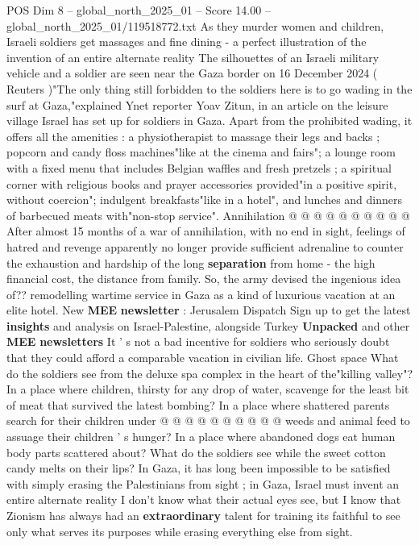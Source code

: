 \begin{textsample}{POS Dim 8 – global\_north\_2025\_01 – Score 14.00 – global\_north\_2025\_01/119518772.txt}  \label{ex:f8_pos_103}
As they murder women and children, Israeli soldiers get massages and fine dining - a perfect illustration of the invention of an entire alternate reality The silhouettes of an Israeli military vehicle and a soldier are seen near the Gaza border on 16 December 2024 ( Reuters )"The only thing still forbidden to the soldiers here is to go wading in the surf at Gaza,"explained Ynet reporter Yoav Zitun, in an article on the leisure village Israel has set up for soldiers in Gaza.
Apart from the prohibited wading, it offers all the amenities : a physiotherapist to massage their legs and backs ; popcorn and candy floss machines"like at the cinema and fairs"; a lounge room with a fixed menu that includes Belgian waffles and fresh pretzels ; a spiritual corner with religious books and prayer accessories provided"in a positive spirit, without coercion"; indulgent breakfasts"like in a hotel", and lunches and dinners of barbecued meats with"non-stop service".
Annihilation @ @ @ @ @ @ @ @ @ @ After almost 15 months of a war of annihilation, with no end in sight, feelings of hatred and revenge apparently no longer provide sufficient adrenaline to counter the exhaustion and hardship of the long \textbf{separation} from home - the high financial cost, the distance from family.
So, the army devised the ingenious idea of?? remodelling wartime service in Gaza as a kind of luxurious vacation at an elite hotel.
New \textbf{MEE} \textbf{newsletter} : Jerusalem Dispatch Sign up to get the latest \textbf{insights} and analysis on Israel-Palestine, alongside Turkey \textbf{Unpacked} and other \textbf{MEE} \textbf{newsletters} It ' s not a bad incentive for soldiers who seriously doubt that they could afford a comparable vacation in civilian life.
Ghost space What do the soldiers see from the deluxe spa complex in the heart of the"killing valley"?
In a place where children, thirsty for any drop of water, scavenge for the least bit of meat that survived the latest bombing?
In a place where shattered parents search for their children under @ @ @ @ @ @ @ @ @ @ weeds and animal feed to assuage their children ' s hunger?
In a place where abandoned dogs eat human body parts scattered about?
What do the soldiers see while the sweet cotton candy melts on their lips?
In Gaza, it has long been impossible to be satisfied with simply erasing the Palestinians from sight ; in Gaza, Israel must invent an entire alternate reality I don't know what their actual eyes see, but I know that Zionism has always had an \textbf{extraordinary} talent for training its faithful to see only what serves its purposes while erasing everything else from sight.

\end{textsample}

